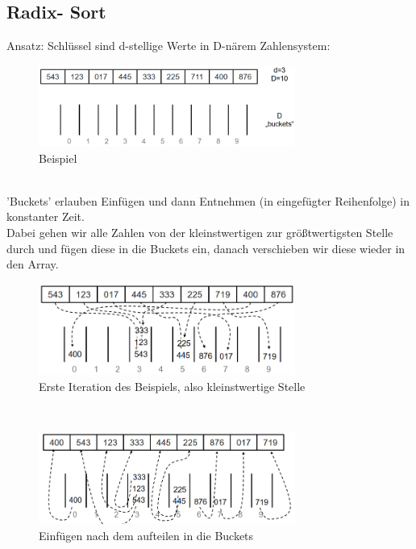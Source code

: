 \documentclass{article}
\begin{document}
        \subsection{Radix- Sort}
            Ansatz: Schlüssel sind d-stellige Werte in D-närem Zahlensystem:\\
            \begin{figure}[ht]
                \centering
                \includegraphics[width=0.75\textwidth]{Bilder/RadixBsp.png}
                \caption{Beispiel}
                \label{fig:RadixBsp}
            \end{figure}\\
            'Buckets' erlauben Einfügen und dann Entnehmen (in eingefügter Reihenfolge) in konstanter Zeit.\\
            Dabei gehen wir alle Zahlen von der kleinstwertigen zur größtwertigsten Stelle durch und fügen diese in die Buckets ein, danach verschieben wir diese wieder in den Array.
            \begin{figure}[ht]
                \centering
                \includegraphics[width=0.75\textwidth]{Bilder/Radix1.png}
                \caption{Erste Iteration des Beispiels, also kleinstwertige Stelle}
                \label{fig:Radix1}
            \end{figure}\\
            \begin{figure}[ht]
                \centering
                \includegraphics[width=0.75\textwidth]{Bilder/Radix2.png}
                \caption{Einfügen nach dem aufteilen in die Buckets}
                \label{fig:Radix2}
            \end{figure}\\
\end{document}
